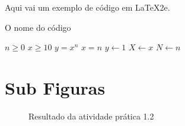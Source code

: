 \par Aqui vai um exemplo de código em \LaTeX2e.

\begin{algorithm} [H]
	\caption{O nome do código}\label{alg:cap}

	\begin{algorithmic} [H]
		\Require $n \geq 0$	
    \Require $x \geq 10$	
		\Ensure $y = x^n$   	
    \Ensure $x = n $      
		\State $y \gets 1$
		\State $X \gets x$
		\State $N \gets n$
	\end{algorithmic}

\end{algorithm}

\section{Sub Figuras}

\begin{figure}[H] %
  \center
  \caption{Resultado da atividade prática 1.2}\label{fig:ap1_cod_vigual1}
\end{figure}


